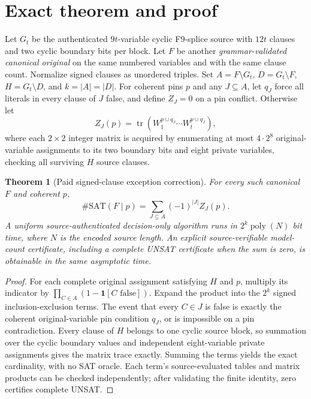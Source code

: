 \documentclass[11pt]{article}
\newtheorem{theorem}{Theorem}
\begin{document}
\section{Exact theorem and proof}
Let $G_t$ be the authenticated $9t$-variable cyclic F9-splice source with $12t$ clauses and two cyclic boundary bits per block. Let $F$ be another \emph{grammar-validated canonical original} on the same numbered variables and with the same clause count. Normalize signed clauses as unordered triples. Set $A=F\setminus G_t$, $D=G_t\setminus F$, $H=G_t\setminus D$, and $k=|A|=|D|$. For coherent pins $p$ and any $J\subseteq A$, let $q_J$ force all literals in every clause of $J$ false, and define $Z_J=0$ on a pin conflict. Otherwise let
\[
  Z_J(p)=\operatorname{tr}(W_1^{p\cup q_J}\cdots W_t^{p\cup q_J}),
\]
where each $2\times2$ integer matrix is acquired by enumerating at most $4\cdot2^8$ original-variable assignments to its two boundary bits and eight private variables, checking all surviving $H$ source clauses.
\begin{theorem}[Paid signed-clause exception correction]
For every such canonical $F$ and coherent $p$,
\[
 \boxed{\#\mathrm{SAT}(F\mid p)=\sum_{J\subseteq A}(-1)^{|J|}Z_J(p).}
\]
A uniform source-authenticated decision-only algorithm runs in
$2^{k}\operatorname{poly}(N)$ bit time, where $N$ is the encoded source length. An explicit source-verifiable model-count certificate, including a complete UNSAT certificate when the sum is zero, is obtainable in the same asymptotic time.
\end{theorem}
\begin{proof}
For each complete original assignment satisfying $H$ and $p$, multiply its indicator by $\prod_{C\in A}(1-\mathbf 1[C\text{ false}])$. Expand the product into the $2^{k}$ signed inclusion-exclusion terms. The event that every $C\in J$ is false is exactly the coherent original-variable pin condition $q_J$, or is impossible on a pin contradiction. Every clause of $H$ belongs to one cyclic source block, so summation over the cyclic boundary values and independent eight-variable private assignments gives the matrix trace exactly. Summing the terms yields the exact cardinality, with no SAT oracle. Each term's source-evaluated tables and matrix products can be checked independently; after validating the finite identity, zero certifies complete UNSAT.
\end{proof}
\end{document}
